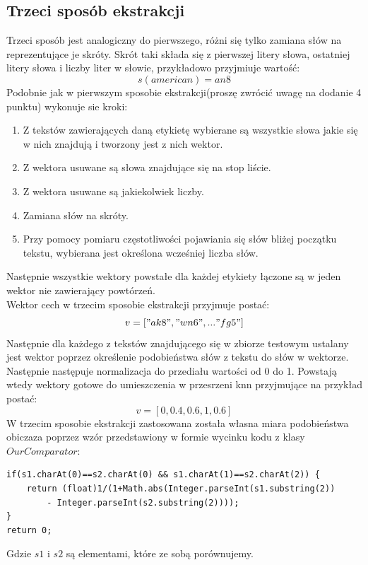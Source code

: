 \documentclass{classrep}
\begin{document}
\subsection{Trzeci sposób ekstrakcji}
	Trzeci sposób jest analogiczny do pierwszego, różni się tylko zamiana słów na reprezentujące je skróty. Skrót taki składa się z pierwszej litery słowa, ostatniej litery słowa i liczby liter w słowie, przykładowo przyjmiuje wartość:\\
	\[ s(american)=an8\]
	Podobnie jak w pierwszym sposobie ekstrakcji(proszę zwrócić uwagę na dodanie 4 punktu) wykonuje sie kroki:
		\begin{enumerate}
	    \item Z tekstów zawierających daną etykietę wybierane są wszystkie słowa jakie się w nich znajdują i tworzony jest z nich wektor.
	    \item Z wektora usuwane są słowa znajdujące się na stop liście.
	    \item Z wektora usuwane są jakiekolwiek liczby.
	    \item Zamiana słów na skróty.
	    \item Przy pomocy pomiaru częstotliwości pojawiania się słów bliżej początku tekstu, wybierana jest określona wcześniej liczba słów.
	\end{enumerate}
	Następnie wszystkie wektory powstałe dla każdej etykiety łączone są w jeden wektor nie zawierający powtórzeń.\\
	Wektor cech w trzecim sposobie ekstrakcji przyjmuje postać:\\
	\[ v = ["ak8", "wn6", ... "fg5"]\]
	Następnie dla każdego z tekstów znajdującego się w zbiorze testowym ustalany jest wektor poprzez określenie podobieństwa słów z tekstu do słów w wektorze. Następnie następuje normalizacja do przediału wartości od 0 do 1. Powstają wtedy wektory gotowe do umieszczenia w przesrzeni knn przyjmujące na przykład postać:\\
	\[ v=[0, 0.4, 0.6, 1, 0.6]\]
	W trzecim sposobie ekstrakcji zastosowana została własna miara podobieństwa obiczaza poprzez wzór przedstawiony w formie wycinku kodu z klasy \(OurComparator\):
	\begin{lstlisting}
if(s1.charAt(0)==s2.charAt(0) && s1.charAt(1)==s2.charAt(2)) {
    return (float)1/(1+Math.abs(Integer.parseInt(s1.substring(2))
        - Integer.parseInt(s2.substring(2))));
}
return 0;
	\end{lstlisting}
	Gdzie \(s1\) i \(s2\) są elementami, które ze sobą porównujemy.
	
\end{document}
